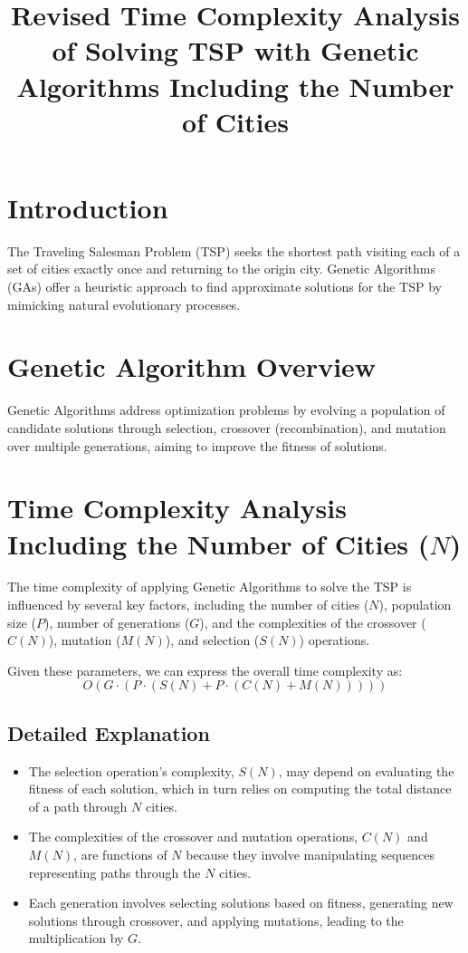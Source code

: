 \documentclass{article}
\begin{document}
	
	\title{Revised Time Complexity Analysis of Solving TSP with Genetic Algorithms Including the Number of Cities}
	\author{}
	\date{}
	\maketitle
	
	\section{Introduction}
	The Traveling Salesman Problem (TSP) seeks the shortest path visiting each of a set of cities exactly once and returning to the origin city. Genetic Algorithms (GAs) offer a heuristic approach to find approximate solutions for the TSP by mimicking natural evolutionary processes.
	
	\section{Genetic Algorithm Overview}
	Genetic Algorithms address optimization problems by evolving a population of candidate solutions through selection, crossover (recombination), and mutation over multiple generations, aiming to improve the fitness of solutions.
	
	\section{Time Complexity Analysis Including the Number of Cities (\(N\))}
	The time complexity of applying Genetic Algorithms to solve the TSP is influenced by several key factors, including the number of cities (\(N\)), population size (\(P\)), number of generations (\(G\)), and the complexities of the crossover (\(C(N)\)), mutation (\(M(N)\)), and selection (\(S(N)\)) operations.
	
	Given these parameters, we can express the overall time complexity as:
	\begin{equation}
		O(G \cdot (P \cdot (S(N) + P \cdot (C(N) + M(N)))))
	\end{equation}
	
	\subsection{Detailed Explanation}
	\begin{itemize}
		\item The selection operation's complexity, \(S(N)\), may depend on evaluating the fitness of each solution, which in turn relies on computing the total distance of a path through \(N\) cities.
		\item The complexities of the crossover and mutation operations, \(C(N)\) and \(M(N)\), are functions of \(N\) because they involve manipulating sequences representing paths through the \(N\) cities.
		\item Each generation involves selecting solutions based on fitness, generating new solutions through crossover, and applying mutations, leading to the multiplication by \(G\).
	\end{itemize}
	
\end{document}
